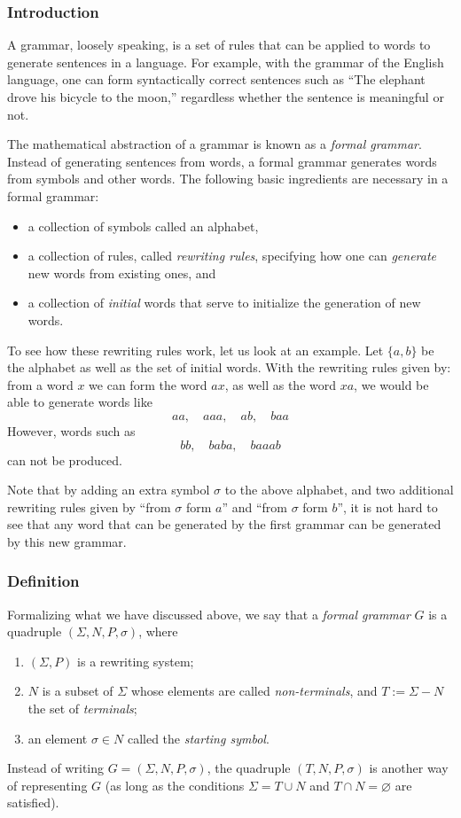 \documentclass[12pt]{article}
\begin{document}

\subsubsection*{Introduction}

A grammar, loosely speaking, is a set of rules that can be applied to words to generate sentences in a language.  For example, with the grammar of the English language, one can form syntactically correct sentences such as ``The elephant drove his bicycle to the moon,'' regardless whether the sentence is meaningful or not.

The mathematical abstraction of a grammar is known as a \emph{formal grammar}.  Instead of generating sentences from words, a formal grammar generates words from symbols and other words.  The following basic ingredients are necessary in a formal grammar: 
\begin{itemize}
\item a collection of symbols called an alphabet, 
\item a collection of rules, called \emph{rewriting rules}, specifying how one can \emph{generate} new words from existing ones, and 
\item a collection of \emph{initial} words that serve to initialize the generation of new words.
\end{itemize}
To see how these rewriting rules work, let us look at an example.  Let $\lbrace a,b\rbrace$ be the alphabet as well as the set of initial words.  With the rewriting rules given by: from a word $x$ we can form the word $ax$, as well as the word $xa$, we would be able to generate words like $$aa, \quad aaa, \quad ab, \quad baa$$  However, words such as $$bb, \quad baba, \quad baaab$$ can not be produced.

Note that by adding an extra symbol $\sigma$ to the above alphabet, and two additional rewriting rules given by ``from $\sigma$ form $a$'' and ``from $\sigma$ form $b$'', it is not hard to see that any word that can be generated by the first grammar can be generated by this new grammar.

\subsubsection*{Definition}

Formalizing what we have discussed above, we say that a \emph{formal grammar} $G$ is a quadruple $(\Sigma,N,P,\sigma)$, where
\begin{enumerate}
\item $(\Sigma,P)$ is a rewriting system;
\item $N$ is a subset of $\Sigma$ whose elements are called \emph{non-terminals}, and $T:=\Sigma-N$ the set of \emph{terminals};
\item an element $\sigma\in N$ called the \emph{starting symbol}.
\end{enumerate}
Instead of writing $G=(\Sigma,N,P,\sigma)$, the quadruple $(T,N,P,\sigma)$ is another way of representing $G$ (as long as the conditions $\Sigma=T\cup N$ and $T\cap N=\varnothing$ are satisfied).
\end{document}
